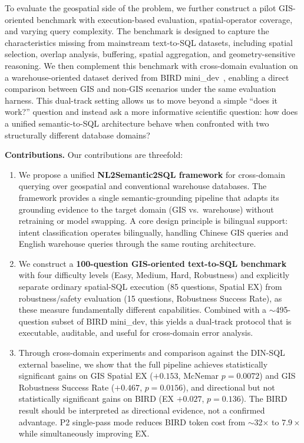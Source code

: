 \documentclass[11pt]{article}
\begin{document}
To evaluate the geospatial side of the problem, we further construct a pilot GIS-oriented benchmark with execution-based evaluation, spatial-operator coverage, and varying query complexity. The benchmark is designed to capture the characteristics missing from mainstream text-to-SQL datasets, including spatial selection, overlap analysis, buffering, spatial aggregation, and geometry-sensitive reasoning. We then complement this benchmark with cross-domain evaluation on a warehouse-oriented dataset derived from BIRD mini\_dev~\cite{li2023bird}, enabling a direct comparison between GIS and non-GIS scenarios under the same evaluation harness. This dual-track setting allows us to move beyond a simple ``does it work?'' question and instead ask a more informative scientific question: how does a unified semantic-to-SQL architecture behave when confronted with two structurally different database domains?

\medskip
\noindent\textbf{Contributions.} Our contributions are threefold:
\begin{enumerate}[leftmargin=*]
  \item We propose a unified \textbf{NL2Semantic2SQL framework} for cross-domain querying over geospatial and conventional warehouse databases. The framework provides a single semantic-grounding pipeline that adapts its grounding evidence to the target domain (GIS vs.\ warehouse) without retraining or model swapping. A core design principle is bilingual support: intent classification operates bilingually, handling Chinese GIS queries and English warehouse queries through the same routing architecture.
  \item We construct a \textbf{100-question GIS-oriented text-to-SQL benchmark} with four difficulty levels (Easy, Medium, Hard, Robustness) and explicitly separate ordinary spatial-SQL execution (85 questions, Spatial EX) from robustness/safety evaluation (15 questions, Robustness Success Rate), as these measure fundamentally different capabilities. Combined with a $\sim$495-question subset of BIRD mini\_dev, this yields a dual-track protocol that is executable, auditable, and useful for cross-domain error analysis.
  \item Through cross-domain experiments and comparison against the DIN-SQL external baseline, we show that the full pipeline achieves statistically significant gains on GIS Spatial EX ($+0.153$, McNemar $p=0.0072$) and GIS Robustness Success Rate ($+0.467$, $p=0.0156$), and directional but not statistically significant gains on BIRD (EX $+0.027$, $p=0.136$). The BIRD result should be interpreted as directional evidence, not a confirmed advantage. P2 single-pass mode reduces BIRD token cost from $\sim$32$\times$ to $7.9\times$ while simultaneously improving EX.
\end{enumerate}
\end{document}
